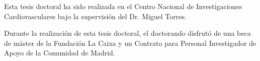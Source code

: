 
\setlength{\parindent}{0pt}

\vspace{100pt}

Esta tesis doctoral ha sido realizada en el Centro Nacional de Investigaciones Cardiovasculares bajo la supervisión del Dr. Miguel Torres. 

\vspace{20pt}

Durante la realización de esta tesis doctoral, el doctorando disfrutó de una beca de máster de la Fundación La Caixa y un Contrato para Personal Investigador de Apoyo de la Comunidad de Madrid.
\thispagestyle{cleared}
\setlength{\parindent}{1.5em}



